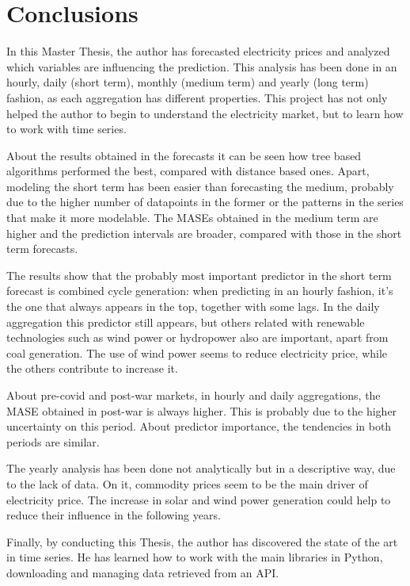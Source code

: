 \chapter{Conclusions}
In this Master Thesis, the author has forecasted electricity prices and analyzed which variables are influencing the prediction. This analysis has been done in an hourly, daily (short term), monthly (medium term) and yearly  (long term) fashion, as each aggregation has different properties. This project has not only helped the author to begin to understand the electricity market, but to learn how to work with time series.

About the results obtained in the forecasts it can be seen how tree based algorithms performed the best, compared with distance based ones. Apart, modeling the short term has been easier than forecasting the medium, probably due to the higher number of datapoints in the former or the patterns in the series that make it more modelable. The MASEs obtained in the medium term are higher and the prediction intervals are broader, compared with those in the short term forecasts.

The results show that the probably most important predictor in the short term forecast is combined cycle generation: when predicting in an hourly fashion, it's the one that always appears in the top, together with some lags. In the daily aggregation this predictor still appears, but others related with renewable technologies such as wind power or hydropower also are important, apart from coal generation. The use of wind power seems to reduce electricity price, while the others contribute to increase it.

About pre-covid and post-war markets, in hourly and daily aggregations, the MASE obtained in post-war is always higher. This is probably due to the higher uncertainty on this period. About predictor importance, the tendencies in both periods are similar.

The yearly analysis has been done not analytically but in a descriptive way, due to the lack of data. On it, commodity prices seem to be the main driver of electricity price. The increase in solar and wind power generation could help to reduce their influence in the following years.

Finally, by conducting this Thesis, the author has discovered the state of the art in time series. He has learned how to work with the main libraries in Python, downloading and managing data retrieved from an API.